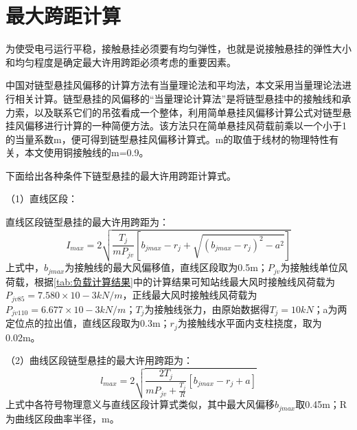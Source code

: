 \section{最大跨距计算}
为使受电弓运行平稳，接触悬挂必须要有均匀弹性，也就是说接触悬挂的弹性大小和均匀程度是确定最大许用跨距必须考虑的重要因素。

中国对链型悬挂风偏移的计算方法有当量理论法和平均法，本文采用当量理论法进行相关计算。链型悬挂的风偏移的“当量理论计算法”是将链型悬挂中的接触线和承力索，以及联系它们的吊弦看成一个整体，利用简单悬挂风偏移计算公式对链型悬挂风偏移进行计算的一种简便方法。该方法只在简单悬挂风荷载前乘以一个小于1的当量系数m，便可得到链型悬挂风偏移计算式。m的取值于线材的物理特性有关，本文使用铜接触线的m=0.9。

下面给出各种条件下链型悬挂的最大许用跨距计算式。

（1）直线区段：

直线区段链型悬挂的最大许用跨距为：
$$
I_{max}=2\sqrt{\frac{T_j}{mP_{jv}}[b_{jmax}-r_j+\sqrt{(b_{jmax}-r_j)^2-a^2}]}
$$
上式中，$b_{jmax}$为接触线的最大风偏移值，直线区段取为0.5m；$P_{jv}$为接触线单位风荷载，根据\ref*{tab:负载计算结果}中的计算结果可知站线最大风时接触线风荷载为$P_{jv85}=7.580×10-3 kN/m$，正线最大风时接触线风荷载为$P_{jv110}=6.677×10-3 kN/m$；$T_j$为接触线张力，由原始数据得$T_j=10 kN$；a为两定位点的拉出值，直线区段取为0.3m；$r_j$为接触线水平面内支柱挠度，取为0.02m。

（2）曲线区段链型悬挂的最大许用跨距为：
$$
l_{max}=2\sqrt{\frac{2T_j}{mP_{jv}+\frac{T_j}{R}}[b_{jmax}-r_j+a]}
$$
上式中各符号物理意义与直线区段计算式类似，其中最大风偏移$b_{jmax}$取0.45m；R为曲线区段曲率半径，m。

